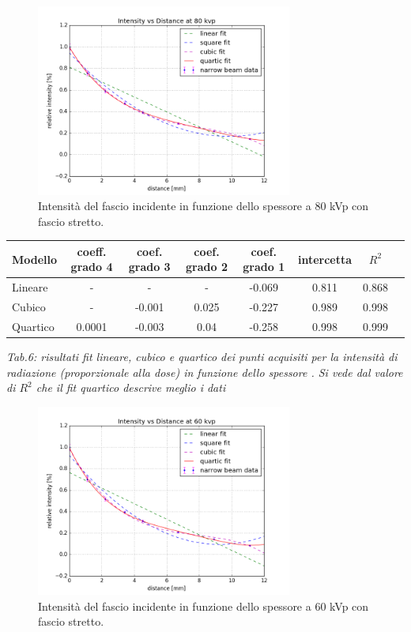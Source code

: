 \documentclass[a4paper]{article}
\begin{document}
\begin{figure}[H]
\centering
\includegraphics[width=0.75\textwidth]{hvl80pvk.png}
\caption{Intensità del fascio incidente in funzione dello spessore a 80 kVp con fascio stretto.}
\end{figure}

\begin{center} 
		
		\begin{tabular}{lccccccc}
			\hline
			\hline
			\textbf{Modello}	& \textbf{coeff. grado 4}&\textbf{coef. grado 3}&\textbf{coef. grado 2}& \textbf{coef. grado 1}& \textbf{intercetta}&  \textbf{$R^{2}$} 	 \\
			\hline
			\hline
			Lineare	&-&-&-&-0.069&0.811&0.868	\\
			Cubico	&-&-0.001&0.025&-0.227&0.989&0.998\\
			Quartico &0.0001&-0.003&0.04&-0.258&0.998&0.999\\
			
			\hline
			\hline
		\end{tabular}
		\linebreak
		\emph{Tab.6: risultati fit lineare, cubico e quartico  dei punti acquisiti per la intensità di radiazione (proporzionale alla dose) in funzione dello spessore . Si vede dal valore di $R^{2}$ che il fit quartico descrive meglio i dati} 
	\end{center} 


\begin{figure}[H]
\centering
\includegraphics[width=0.75\textwidth]{hvl60pvk.png}
\caption{Intensità del fascio incidente in funzione dello spessore a 60 kVp con fascio stretto.}
\end{figure}
\end{document}
